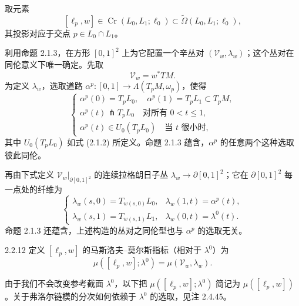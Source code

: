 取元素
\[
  [\ell_p,w]\in\operatorname{Cr}(L_0,L_1;\ell_0)
  \subset\widetilde\Omega(L_0,L_1;\ell_0),
\]
其投影对应于交点 $p\in L_0\cap L_1$。

利用命题 2.1.3，在方形 $[0,1]^2$ 上为它配置一个辛丛对 $(\mathcal V_w,\lambda_w)$；这个丛对在同伦意义下唯一确定。先取
\[
  \mathcal V_w=w^*TM.
\]
为定义 $\lambda_w$，选取道路
$\alpha^p:[0,1]\to\Lambda(T_pM,\omega_p)$，使得
\begin{equation}
  \begin{cases}
    \alpha^p(0)=T_pL_0,
      \quad \alpha^p(1)=T_pL_1\subset T_pM,\\
    \alpha^p(t)\pitchfork T_pL_0
      \quad\text{对所有 }0<t\leq1,\\
    \alpha^p(t)\in U_0(T_pL_0)
      \quad\text{当 $t$ 很小时},
  \end{cases}
  \tag{2.2.10}\label{eq:2-2-10}
\end{equation}
其中 $U_0(T_pL_0)$ 如式 (2.1.2) 所定义。命题 2.1.3 蕴含，$\alpha^p$ 的任意两个这种选取彼此同伦。

再由下式定义 $\mathcal V_w|_{\partial[0,1]^2}$ 的连续拉格朗日子丛
$\lambda_w\to\partial[0,1]^2$；它在 $\partial[0,1]^2$ 每一点处的纤维为
\begin{equation}
  \begin{cases}
    \lambda_w(s,0)=T_{w(s,0)}L_0,
      &\lambda_w(1,t)=\alpha^p(t),\\
    \lambda_w(s,1)=T_{w(s,1)}L_1,
      &\lambda_w(0,t)=\lambda^0(t).
  \end{cases}
  \tag{2.2.11}\label{eq:2-2-11}
\end{equation}
命题 2.1.3 还蕴含，上述构造的丛对之同伦型也与 $\alpha^p$ 的选取无关。

\begin{definition}{2.2.12}\label{def:2-2-12}
定义 $[\ell_p,w]$ 的马斯洛夫--莫尔斯指标（相对于 $\lambda^0$）为
\[
  \mu([\ell_p,w];\lambda^0)=\mu(\mathcal V_w,\lambda_w).
\]
\end{definition}

由于我们不会改变参考截面 $\lambda^0$，以下把
$\mu([\ell_p,w];\lambda^0)$ 简记为 $\mu([\ell_p,w])$。关于弗洛尔链模的分次如何依赖于 $\lambda^0$ 的选取，见注 2.4.45。
